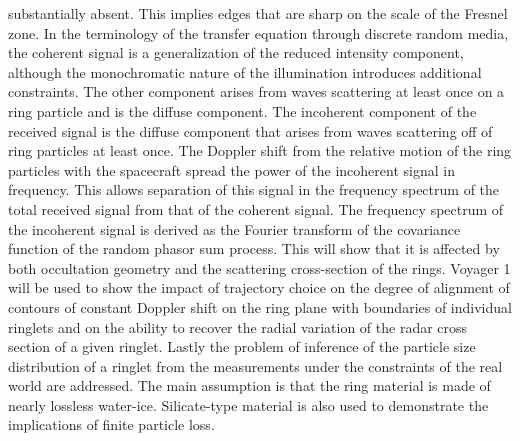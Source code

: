 \documentclass[oneside]{book}
\theoremstyle{mystyle}
\begin{document}
substantially absent. This implies edges that are sharp on the scale of the Fresnel zone. In the terminology of the transfer equation through discrete random media, the coherent signal is a generalization of the reduced intensity component, although the monochromatic nature of the illumination introduces additional constraints. The other component arises from waves scattering at least once on a ring particle and is the diffuse component. The incoherent component of the received signal is the diffuse component that arises from waves scattering off of ring particles at least once. The Doppler shift from the relative motion of the ring particles with the spacecraft spread the power of the incoherent signal in frequency. This allows separation of this signal in the frequency spectrum of the total received signal from that of the coherent signal. The frequency spectrum of the incoherent signal is derived as the Fourier transform of the covariance function of the random phasor sum process. This will show that it is affected by both occultation geometry and the scattering cross-section of the rings. Voyager 1 will be used to show the impact of trajectory choice on the degree of alignment of contours of constant Doppler shift on the ring plane with boundaries of individual ringlets and on the ability to recover the radial variation of the radar cross section of a given ringlet. Lastly the problem of inference of the particle size distribution of a ringlet from the measurements under the constraints of the real world are addressed. The main assumption is that the ring material is made of nearly lossless water-ice. Silicate-type material is also used to demonstrate the implications of finite particle loss.
\end{document}
